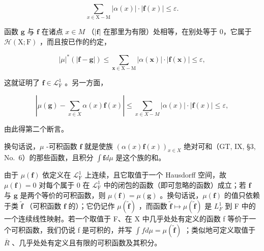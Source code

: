 \[
\sum_ {x \in \mathrm{X} - \mathrm{M}} | \alpha (x) | \cdot | \mathbf {f} (x) | \leqslant \varepsilon .
\]

函数 \(\mathbf{g}\) 与 \(\mathbf{f}\) 在诸点 \(x\in M\) （\(|\mathbf{f}|\) 在那里为有限）处相等，在别处等于 0，它属于 \(\mathcal{H}(\mathrm{X};\mathrm{F})\) ，而且按已作的约定，

\[
| \mu | ^ {*} (| \mathbf {f} - \mathbf {g} |) \leqslant \sum_ {\boldsymbol {x} \in \mathrm{X} - \mathrm{M}} | \alpha (\boldsymbol {x}) | \cdot | \mathbf {f} (\boldsymbol {x}) | \leqslant \varepsilon ,
\]

这就证明了 \(\mathbf{f} \in \mathcal{L}_{\mathrm{F}}^{1}\) 。另一方面，

\[
\left| \mu (\mathbf {g}) - \sum_ {x \in X} \alpha (x) \mathbf {f} (x) \right| \leqslant \sum_ {x \in X - M} | \alpha (x) | \cdot | \mathbf {f} (x) | \leqslant \varepsilon ,
\]

由此得第二个断言。

换句话说，\(\mu\) -可积函数 \(\mathbf{f}\) 就是使族 \((\alpha(x)\mathbf{f}(x))_{x\in X}\) 绝对可和（GT, IX, §3, No.~6）的那些函数，且积分 \(\int \mathbf{f} d\mu\) 是这个族的和。

由于 \(\mu(\mathbf{f})\) 依定义在 \(\mathcal{L}_{\mathrm{F}}^{1}\) 上连续，且它取值于一个 Hausdorff 空间，故 \(\mu(\mathbf{f}) = 0\) 对每个属于 0 在 \(\mathcal{L}_{\mathrm{F}}^{1}\) 中的闭包的函数（即可忽略的函数）成立；若 \(\mathbf{f}\) 与 \(\mathbf{g}\) 是两个等价的可积函数，则 \(\mu(\mathbf{f}) = \mu(\mathbf{g})\) 。换句话说，\(\mu(\mathbf{f})\) 的值只依赖于类 \(\widetilde{\mathbf{f}}\) （可积函数 \(\mathbf{f}\) 的）；它仍记作 \(\mu(\widetilde{\mathbf{f}})\) ，而函数 \(\widetilde{\mathbf{f}} \mapsto \mu(\widetilde{\mathbf{f}})\) 是 \(L_{F}^{1}\) 到 F 中的一个连续线性映射。若一个取值于 F、在 X 中几乎处处有定义的函数 f 等价于一个可积函数，我们仍说 f 是可积的，并写 \(\int f d\mu = \mu(\widetilde{\mathbf{f}})\) ；类似地可定义取值于 \(\overline{R}\) 、几乎处处有定义且有限的可积函数及其积分。

